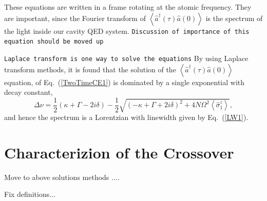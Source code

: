 \documentclass[aps,prl,twocolumn,
superscriptaddress,groupedaddress]{revtex4}
\newcommand{\dmcomment}[1]{{\tt #1}}
\begin{document}
These equations are written in a frame rotating at the atomic frequency.
They are important, since the Fourier transform of
$\left<\hat{a}^{\dagger}(\tau)\hat{a}(0)\right>$ is the spectrum of the
light inside our cavity QED system.  \dmcomment{Discussion of importance
of this equation should be moved up}


\dmcomment{Laplace transform is one way to solve the equations} By using
Laplace transform methods, it is found that the solution of the
$\left<\hat{a}^{\dagger}(\tau)\hat{a}(0)\right>$ equation, of
Eq.~(\ref{TwoTimeCE1}) is dominated by a single exponential with decay
constant,
\begin{equation}
\Delta \nu = \frac{1}{2}(\kappa+\Gamma-2i\delta) -
\frac{1}{2} \sqrt{(-\kappa+\Gamma+2i\delta)^2 +
4N\Omega^2 \left<\hat{\sigma}_{1}^{z}\right>},
\label{LW1}
\end{equation}
and hence the spectrum is a Lorentzian with linewidth given by
Eq.~(\ref{LW1}).


\section{Characterizion of the Crossover}

Move to above solutions methods ....

Fix definitions...
\end{document}
